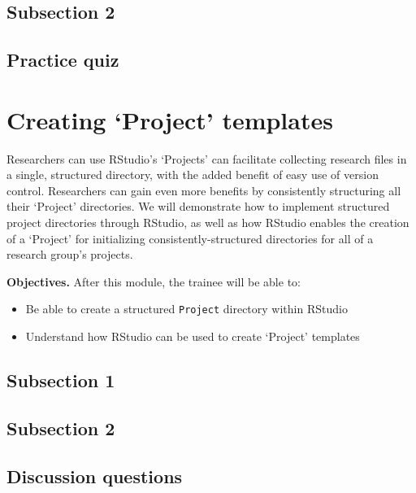 \documentclass[]{tufte-book}
\providecommand{\tightlist}{%
  \setlength{\itemsep}{0pt}\setlength{\parskip}{0pt}}
\begin{document}
\hypertarget{subsection-2-1}{%
\subsection{Subsection 2}\label{subsection-2-1}}

\hypertarget{practice-quiz-1}{%
\subsection{Practice quiz}\label{practice-quiz-1}}

\hypertarget{creating-project-templates}{%
\section{Creating `Project' templates}\label{creating-project-templates}}

Researchers can use RStudio's `Projects' can facilitate collecting research
files in a single, structured directory, with the added benefit of easy use of
version control. Researchers can gain even more benefits by consistently
structuring all their `Project' directories. We will demonstrate how to
implement structured project directories through RStudio, as well as how RStudio
enables the creation of a `Project' for initializing consistently-structured
directories for all of a research group's projects.

\textbf{Objectives.} After this module, the trainee will be able to:

\begin{itemize}
\tightlist
\item
  Be able to create a structured \texttt{Project} directory within RStudio
\item
  Understand how RStudio can be used to create `Project' templates
\end{itemize}

\hypertarget{subsection-1-3}{%
\subsection{Subsection 1}\label{subsection-1-3}}

\hypertarget{subsection-2-2}{%
\subsection{Subsection 2}\label{subsection-2-2}}

\hypertarget{discussion-questions-2}{%
\subsection{Discussion questions}\label{discussion-questions-2}}
\end{document}
